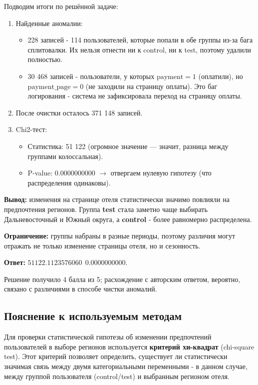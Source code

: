 \documentclass[pract]{SCWorks}
\begin{document}
Подводим итоги по решённой задаче:

\begin{enumerate}
    \item Найденные аномалии:
    \begin{itemize}
        \item 228 записей - 114 пользователей, которые попали в обе группы из-за бага сплитовалки. 
        Их нельзя отнести ни к control, ни к test, поэтому удалили полностью.
        \item 30 468 записей - пользователи, у которых $\text{payment} = 1$ (оплатили), но $\text{payment\_page} = 0$ 
        (не заходили на страницу оплаты). Это баг логирования - система не зафиксировала переход на страницу оплаты. 
    \end{itemize}
    \item После очистки осталось 371 148 записей.
    \item Chi2-тест:
    \begin{itemize}
        \item Статистика: 51 122 (огромное значение — значит, разница между группами колоссальная).
        \item P-value: 0.0000000000 $\rightarrow$ отвергаем нулевую гипотезу (что распределения одинаковы).
    \end{itemize}
\end{enumerate}

\textbf{Вывод:} изменения на странице отеля статистически значимо повлияли на предпочтения регионов. 
Группа \textbf{test} стала заметно чаще выбирать Дальневосточный и Южный округа, а \textbf{control} - более равномерно распределена.

\textbf{Ограничение:} группы набраны в разные периоды, поэтому различия могут отражать не только изменение
страницы отеля, но и сезонность.

\textbf{Ответ:} $51122.1123576060\:\:0.0000000000$.

Решение получило 4 балла из 5; расхождение с авторским ответом, вероятно, связано с различиями в способе
чистки аномалий.

\subsection*{Пояснение к используемым методам}

Для проверки статистической гипотезы об изменении предпочтений пользователей в выборе регионов используется 
\textbf{критерий хи-квадрат} (chi-square test). Этот критерий позволяет определить, существует ли статистически 
значимая связь между двумя категориальными переменными - в данном случае, между группой пользователя 
(control/test) и выбранным регионом отеля.
\end{document}
